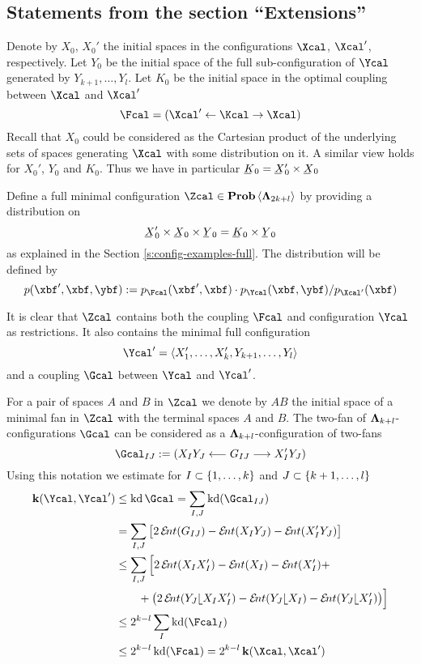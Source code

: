 \def\thesubsection{\thesection.\ref{s:extensions}}
\subsection{Statements from the section ``Extensions''}
\begin{Proof}
  Denote by $X_{0}$, $X_{0}'$ the initial spaces in the
  configurations $\Xcal$, $\Xcal'$, respectively.
  Let $Y_{0}$ be the initial space of the full sub-configuration of
  $\Ycal$ generated by $Y_{k+1},\ldots,Y_{l}$. Let $K_{0}$ be the
  initial space in the optimal coupling between $\Xcal$ and $\Xcal'$
  \[
  \Fcal=(\Xcal'\ot\Kcal\to\Xcal)
  \]
  Recall that $X_{0}$ could be considered as the Cartesian product of
  the underlying sets of spaces generating $\Xcal$ with some
  distribution on it. A similar view holds for $X_{0}'$, $Y_{0}$ and
  $K_{0}$.
  Thus we have in particular $\un K_{0}=\un X_{0}'\times\un X_{0}$
  
  Define a full minimal configuration
  $\Zcal\in\prob\<\Lambdabf_{2k+l}>$ by providing a distribution on
  \[
  \un X_{0}'\times\un X_{0}\times\un Y_{0}=\un K_{0}\times\un Y_{0}
  \]
  as explained in the Section \ref{s:config-examples-full}.
  The distribution will be defined by
  \[
  p(\xbf',\xbf,\ybf)
  :=
  p_{\Fcal}(\xbf',\xbf)\cdot p_{\Ycal}(\xbf,\ybf)/p_{\Xcal'}(\xbf)
  \]
  
  It is clear that $\Zcal$ contains both the coupling $\Fcal$ and
  configuration $\Ycal$ as restrictions. It also contains the minimal full
  configuration 
  \[
  \Ycal'=\<X_{1}',\ldots,X_{k}',Y_{k+1},\ldots,Y_{l}>
  \]
  and a coupling $\Gcal$ between $\Ycal$ and $\Ycal'$. 
  
  For a pair of spaces $A$ and $B$ in $\Zcal$ we denote by $AB$
  the initial space of a minimal fan in $\Zcal$ with the terminal
  spaces $A$ and $B$. 
  The two-fan of $\bm\Lambda_{k+l}$-con\-fi\-gu\-rations $\Gcal$ can be considered as a $\bm\Lambda_{k+l}$-configuration
  of two-fans
  \[
  \Gcal_{IJ}:=(X_{I}Y_{J}\oot G_{IJ}\too X'_{I}Y_{J})
  \]
  Using this notation we estimate for $I\subset\left\{1,\ldots,k\right\}$ and
  	$J\subset\left\{k+1,\ldots,l\right\}$
  \begin{align*}
    \ikd(\Ycal,\Ycal')
    &\leq
    \kd{\Gcal}
    =
    \sum_{I,J}\kd(\Gcal_{IJ})
    \\
    &=
    \sum_{I,J}
      \big[
        2\ent(G_{IJ})-\ent(X_{I}Y_{J})-\ent(X_{I}'Y_{J})
      \big]
    \\
    &\leq
    \sum_{I,J}
    \Big[
      2\ent(X_{I}X'_{I})-\ent(X_{I})-\ent(X_{I}')+\\
      &\quad\quad+
      \big(
        2\ent(Y_{J}\rel X_{I}X_{I}')-\ent(Y_{J}\rel
        X_{I})-\ent(Y_{J}\rel X_{I}')
      \big)
    \Big]
    \\
    &\leq
    2^{k-l}
    \sum_{I}\kd(\Fcal_{I})
    \\
    &\leq
    2^{k-l}\kd(\Fcal)
    =
    2^{k-l}\ikd(\Xcal,\Xcal')
  \end{align*}
\end{Proof}
  

